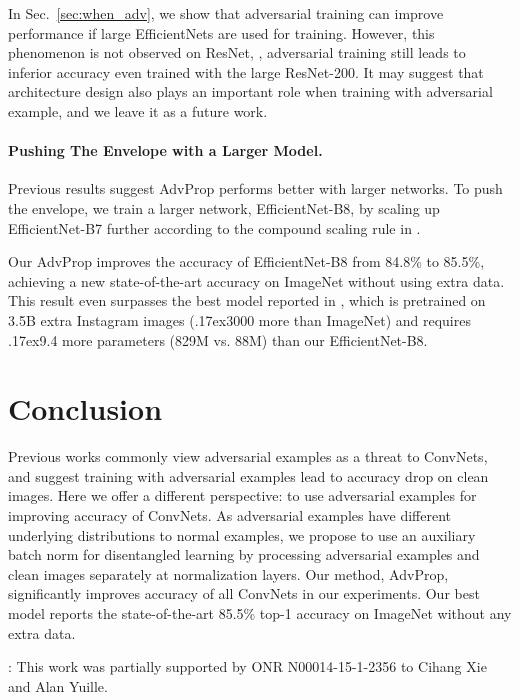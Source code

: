 \documentclass[10pt,twocolumn,letterpaper]{article}
\newcommand{\app}{\raise.17ex\hbox{}}
\begin{document}
In Sec.~\ref{sec:when_adv}, we show that adversarial training can improve performance if large EfficientNets are used for training. However, this phenomenon is not observed on ResNet, \eg, adversarial training still leads to inferior accuracy even trained with the large ResNet-200. It may suggest that architecture design also plays an important role when training with adversarial example, and we leave it as a future work.


\paragraph{Pushing The Envelope with a Larger Model.} Previous results suggest AdvProp performs better with larger networks. To push the envelope, we train a larger network, EfficientNet-B8, by scaling up EfficientNet-B7 further according to the compound scaling rule in \cite{Tan2019}. 


Our AdvProp improves the accuracy of EfficientNet-B8 from 84.8\% to 85.5\%, achieving a new state-of-the-art accuracy on ImageNet without using extra data. This result even surpasses the best model reported in \cite{Mahajan2018}, which is pretrained on 3.5B extra Instagram images (\app 3000 more than ImageNet) and requires \app 9.4 more parameters (829M vs. 88M) than our EfficientNet-B8.


\section{Conclusion}
Previous works commonly view adversarial examples as a threat to ConvNets, and suggest training with adversarial examples lead to accuracy drop on clean images.
Here we offer a different perspective: to use adversarial examples for improving accuracy of ConvNets. As adversarial examples have different underlying distributions to normal examples, we propose to use an auxiliary batch norm for disentangled learning by processing adversarial examples and clean images separately at normalization layers. Our method, AdvProp, significantly improves accuracy of all ConvNets in our experiments. Our best model reports the state-of-the-art 85.5\% top-1 accuracy on ImageNet without any extra data.


{\footnotesize
{: This work was partially supported by ONR N00014-15-1-2356 to Cihang Xie and Alan Yuille.}
}


{\small


}
\end{document}
